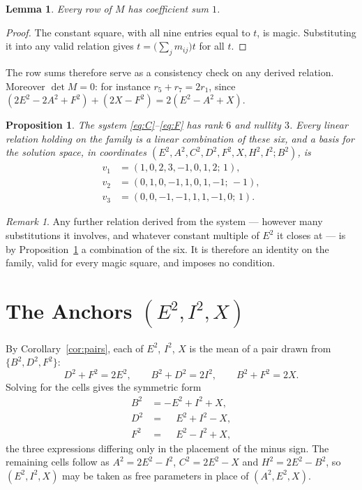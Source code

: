\documentclass[12pt]{article}
\newtheorem{lemma}[theorem]{Lemma}
\newtheorem{proposition}[theorem]{Proposition}
\theoremstyle{remark}
\newtheorem{remark}[theorem]{Remark}
\begin{document}
\begin{lemma}
Every row of $M$ has coefficient sum $1$.
\end{lemma}

\begin{proof}
The constant square, with all nine entries equal to $t$, is magic.
Substituting it into any valid relation gives
$t = \bigl(\sum_j m_{ij}\bigr) t$ for all $t$.
\end{proof}

The row sums therefore serve as a consistency check on any derived
relation. Moreover $\det M = 0$: for instance
$r_5 + r_7 = 2r_1$, since
$(2E^2 - 2A^2 + F^2) + (2X - F^2) = 2(E^2 - A^2 + X)$.

\begin{proposition}\label{prop:rank}
The system \eqref{eq:C}--\eqref{eq:F} has rank $6$ and nullity $3$.
Every linear relation holding on the family is a linear combination of
these six, and a basis for the solution space, in coordinates
$(E^2, A^2, C^2, D^2, F^2, X, H^2, I^2; B^2)$, is
\begin{align*}
v_1 &= (1,0,2,3,-1,0,1,2;\,1),\\
v_2 &= (0,1,0,-1,1,0,1,-1;\,-1),\\
v_3 &= (0,0,-1,-1,1,1,-1,0;\,1).
\end{align*}
\end{proposition}

\begin{remark}
Any further relation derived from the system --- however many
substitutions it involves, and whatever constant multiple of $E^2$ it
closes at --- is by Proposition~\ref{prop:rank} a combination of the
six. It is therefore an identity on the family, valid for every magic
square, and imposes no condition.
\end{remark}

\section{The Anchors $(E^2, I^2, X)$}\label{sec:anchors}

By Corollary~\ref{cor:pairs}, each of $E^2$, $I^2$, $X$ is the mean of a
pair drawn from $\{B^2, D^2, F^2\}$:
\[
D^2 + F^2 = 2E^2, \qquad B^2 + D^2 = 2I^2, \qquad B^2 + F^2 = 2X .
\]
Solving for the cells gives the symmetric form
\begin{align}
B^2 &= -E^2 + I^2 + X, \label{eq:Ba}\\
D^2 &= \phantom{-}E^2 + I^2 - X, \label{eq:Da}\\
F^2 &= \phantom{-}E^2 - I^2 + X, \label{eq:Fa}
\end{align}
the three expressions differing only in the placement of the minus
sign. The remaining cells follow as $A^2 = 2E^2 - I^2$,
$C^2 = 2E^2 - X$ and $H^2 = 2E^2 - B^2$, so $(E^2, I^2, X)$ may be
taken as free parameters in place of $(A^2, E^2, X)$.
\end{document}
